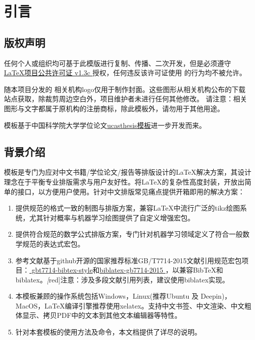 \chapter{引言} \label{chap:intro}

\section{版权声明}

任何个人或组织均可基于此模版进行复制、传播、二次开发，但是必须遵守
\href{https://www.latex-project.org/lppl/lppl-1-3c/}{\LaTeX{}项目公共许可证 v1.3c } 授权，任何违反该许可证使用 \projectname 的行为均不被允许。

随本项目分发的 相关机构logo仅用于制作封面。这些图形从相关机构公布的下载站点获取，除裁剪周边空白外，项目维护者未进行任何其他修改。 请注意：相关图形与文字都属于原机构的注册商标，除此模板外，请勿用于其他用途。

\projectname 模板基于中国科学院大学学位论文\href{https://github.com/mohuangrui/ucasthesis}{ucasthesis模板}进一步开发而来。

\section{背景介绍}
\projectname 模板是专门为应对中文书籍/学位论文/报告等排版设计的\LaTeX{}解决方案，其设计理念在于平衡专业排版需求与用户友好性。\projectname 将\LaTeX{}的复杂性高度封装，开放出简单的接口，以方便用户使用。针对中文排版常见痛点提供开箱即用的解决方案：
\begin{enumerate}
    \item 提供规范的格式一致的制图与排版方案，兼容\LaTeX{}中流行广泛的tikz绘图系统，尤其针对概率与机器学习绘图提供了自定义增强宏包。
    \item 提供符合规范的数学公式排版方案，专门针对机器学习领域定义了符合一般数学规范的表达式宏包。
    \item 参考文献基于github开源的国家推荐标准GB/T7714-2015文献引用规范宏包项目：\href{https://github.com/zepinglee/gbt7714-bibtex-style}{
gbt7714-bibtex-style}和\href{https://github.com/hushidong/biblatex-gb7714-2015}{biblatex-gb7714-2015
}，以兼容BibTeX和biblatex。\emph[red]{注意：涉及多段文献引用列表，建议使用biblatex实现}。
    \item 本模板兼顾的操作系统包括Windows，Linux(推荐Ubuntu 及 Deepin)，MacOS，\LaTeX{}编译引擎推荐使用xelatex。支持中文书签、中文渲染、中文粗体显示、拷贝PDF中的文本到其他文本编辑器等特性。
    \item 针对本套模板的使用方法及命令，本文档提供了详尽的说明。
\end{enumerate}

